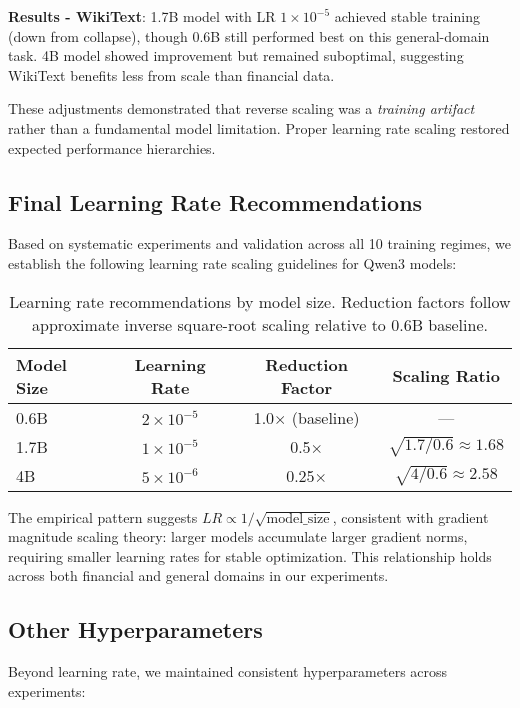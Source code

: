 \textbf{Results - WikiText}: 1.7B model with LR $1 \times 10^{-5}$ achieved stable training (down from collapse), though 0.6B still performed best on this general-domain task. 4B model showed improvement but remained suboptimal, suggesting WikiText benefits less from scale than financial data.

These adjustments demonstrated that reverse scaling was a \textit{training artifact} rather than a fundamental model limitation. Proper learning rate scaling restored expected performance hierarchies.

\subsection{Final Learning Rate Recommendations}

Based on systematic experiments and validation across all 10 training regimes, we establish the following learning rate scaling guidelines for Qwen3 models:

\begin{table}[h]
\centering
\begin{tabular}{lccc}
\toprule
\textbf{Model Size} & \textbf{Learning Rate} & \textbf{Reduction Factor} & \textbf{Scaling Ratio} \\
\midrule
0.6B & $2 \times 10^{-5}$ & 1.0$\times$ (baseline) & --- \\
1.7B & $1 \times 10^{-5}$ & 0.5$\times$ & $\sqrt{1.7/0.6} \approx 1.68$ \\
4B & $5 \times 10^{-6}$ & 0.25$\times$ & $\sqrt{4/0.6} \approx 2.58$ \\
\bottomrule
\end{tabular}
\caption{Learning rate recommendations by model size. Reduction factors follow approximate inverse square-root scaling relative to 0.6B baseline.}
\end{table}

The empirical pattern suggests $LR \propto 1/\sqrt{\text{model\_size}}$, consistent with gradient magnitude scaling theory: larger models accumulate larger gradient norms, requiring smaller learning rates for stable optimization. This relationship holds across both financial and general domains in our experiments.

\subsection{Other Hyperparameters}

Beyond learning rate, we maintained consistent hyperparameters across experiments:

